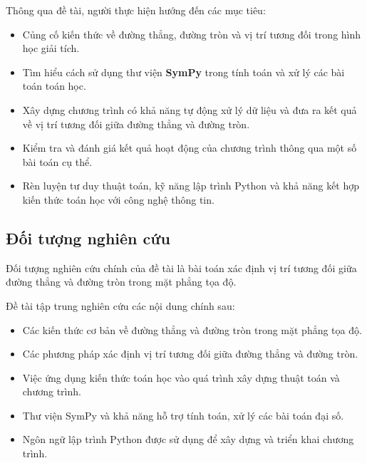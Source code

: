 \documentclass[12pt,a4paper]{article}
\begin{document}
Thông qua đề tài, người thực hiện hướng đến các mục tiêu:

\begin{itemize}
    \item Củng cố kiến thức về đường thẳng, đường tròn và vị trí tương đối trong hình học giải tích.
    
    \item Tìm hiểu cách sử dụng thư viện \textbf{SymPy} trong tính toán và xử lý các bài toán toán học.
    
    \item Xây dựng chương trình có khả năng tự động xử lý dữ liệu và đưa ra kết quả về vị trí tương đối giữa đường thẳng và đường tròn.
    
    \item Kiểm tra và đánh giá kết quả hoạt động của chương trình thông qua một số bài toán cụ thể.
    
    \item Rèn luyện tư duy thuật toán, kỹ năng lập trình Python và khả năng kết hợp kiến thức toán học với công nghệ thông tin.
\end{itemize}


\subsection{Đối tượng nghiên cứu}

Đối tượng nghiên cứu chính của đề tài là bài toán xác định vị trí tương đối giữa đường thẳng và đường tròn trong mặt phẳng tọa độ.

Đề tài tập trung nghiên cứu các nội dung chính sau:

\begin{itemize}
    \item Các kiến thức cơ bản về đường thẳng và đường tròn trong mặt phẳng tọa độ.
    
    \item Các phương pháp xác định vị trí tương đối giữa đường thẳng và đường tròn.
    
    \item Việc ứng dụng kiến thức toán học vào quá trình xây dựng thuật toán và chương trình.
    
    \item Thư viện SymPy và khả năng hỗ trợ tính toán, xử lý các bài toán đại số.
    
    \item Ngôn ngữ lập trình Python được sử dụng để xây dựng và triển khai chương trình.
\end{itemize}
\end{document}

